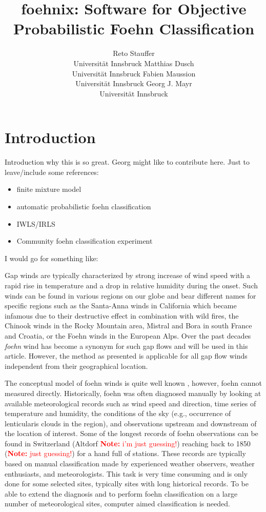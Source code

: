 \documentclass[article,nojss,shortnames]{jss}
\author{Reto Stauffer\\Universit\"at Innsbruck
\And Matthias Dusch\\Universit\"at Innsbruck
\AND Fabien Maussion\\Universit\"at Innsbruck
\And Georg J. Mayr\\Universit\"at Innsbruck}
\title{foehnix: Software for Objective Probabilistic Foehn Classification}
\newcommand{\note}[1]{\textcolor{red}{\textbf{Note:} #1}}
\begin{document}
\section{Introduction}

Introduction why this is so great. Georg might like to contribute
here. Just to leave/include some references:
\begin{itemize}
    \item finite mixture model \citep{leisch2004,gruen2008}
    \item automatic probabilistic foehn classification \cite{plavcan2014}
    \item IWLS/IRLS \citep{mccullagh1989}
    \item Community foehn classification experiment \cite{mayr2018}
\end{itemize}

I would go for something like:

Gap winds are typically characterized by strong increase of wind speed with a rapid
rise in temperature and a drop in relative humidity during the onset. Such winds can be
found in various regions on our globe and bear different names for specific
regions such as the Santa-Anna winds in California which became infamous due to
their destructive effect in combination with wild fires, the Chinook winds in
the Rocky Mountain area, Mistral and Bora in south France and Croatia, or the
Foehn winds in the European Alps.  Over the past decades \textit{foehn} wind
has become a synonym for such gap flows and will be used in this article.
However, the method as presented is applicable for all gap flow winds
independent from their geographical location.

The conceptual model of foehn winds is quite well known
\citep{armi2007,mayr2008,armi2011}, however, foehn cannot measured directly.
Historically, foehn was often diagnosed manually by looking at available
meteorological records such as wind speed and direction, time series of
temperature and humidity, the conditions of the sky (e.g., occurrence of
lenticularis clouds in the region), and observations upstream and downstream of
the location of interest.  Some of the longest records of foehn observations
can be found in Switzerland (Altdorf \note{i'm just guessing!}) reaching back
to 1850 (\note{just guessing!}) for a hand full of stations.  These records are
typically based on manual classification made by experienced weather observers,
weather enthusiasts, and meteorologists.  This task is very time consuming and
is only done for some selected sites, typically sites with long historical
records. To be able to extend the diagnosis and to perform foehn classification
on a large number of meteorological sites, computer aimed classification is
needed.
\end{document}
